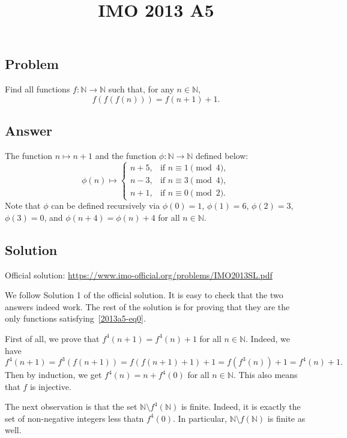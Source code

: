 \documentclass{article}
\title{IMO 2013 A5}
\author{}
\date{}
\newcommand{\N}{\mathbb{N}}
\begin{document}
\maketitle



\subsection*{Problem}

Find all functions $f : \N \to \N$ such that, for any $n \in \N$,
\[ f(f(f(n))) = f(n + 1) + 1. \tag{*}\label{2013a5-eq0} \]



\subsection*{Answer}

The function $n \mapsto n + 1$ and the function $\phi : \N \to \N$ defined below:
\[ \phi(n) \mapsto \begin{cases}
    n + 5, & \text{if } n \equiv 1 \pmod{4}, \\
    n - 3, & \text{if } n \equiv 3 \pmod{4}, \\
    n + 1, & \text{if } n \equiv 0 \pmod{2}.
\end{cases} \]
Note that $\phi$ can be defined recursively via $\phi(0) = 1$, $\phi(1) = 6$, $\phi(2) = 3$, $\phi(3) = 0$, and $\phi(n + 4) = \phi(n) + 4$ for all $n \in \N$.



\subsection*{Solution}

Official solution: \url{https://www.imo-official.org/problems/IMO2013SL.pdf}

We follow Solution 1 of the official solution.
It is easy to check that the two answers indeed work.
The rest of the solution is for proving that they are the only functions satisfying~\eqref{2013a5-eq0}.

First of all, we prove that $f^4(n + 1) = f^4(n) + 1$ for all $n \in \N$.
Indeed, we have
\[ f^4(n + 1) = f^3(f(n + 1)) = f(f(n + 1) + 1) + 1 = f(f^3(n)) + 1 = f^4(n) + 1. \]
Then by induction, we get $f^4(n) = n + f^4(0)$ for all $n \in \N$.
This also means that $f$ is injective.

The next observation is that the set $\N \setminus f^4(\N)$ is finite.
Indeed, it is exactly the set of non-negative integers less thatn $f^4(0)$.
In particular, $\N \setminus f(\N)$ is finite as well.
\end{document}
